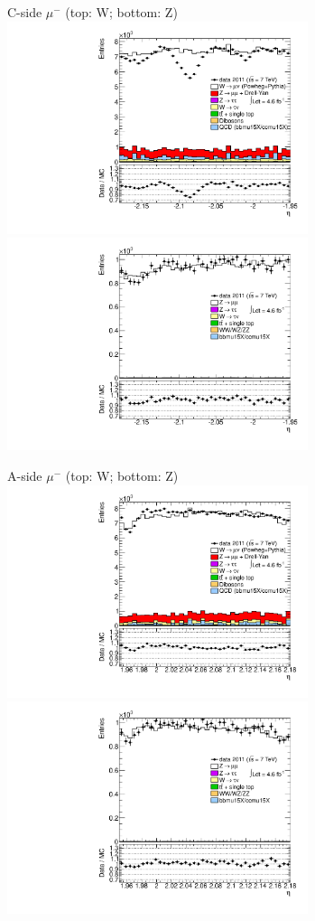 {{
C-side $\mu^{-}$ (top: W; bottom: Z)
\centering
\includegraphics[width=0.66\textwidth]{dates/20130306/figures/etaphi/Widms_10_C_stack_l_eta_NEG} \\
\includegraphics[width=0.66\textwidth]{dates/20130306/figures/etaphi/Zidms_10_C_stack_lN_eta_ALL.pdf}

A-side $\mu^{-}$ (top: W; bottom: Z)
\centering
\includegraphics[width=0.66\textwidth]{dates/20130306/figures/etaphi/Widms_10_A_stack_l_eta_NEG} \\
\includegraphics[width=0.66\textwidth]{dates/20130306/figures/etaphi/Zidms_10_A_stack_lN_eta_ALL.pdf} 

}}
